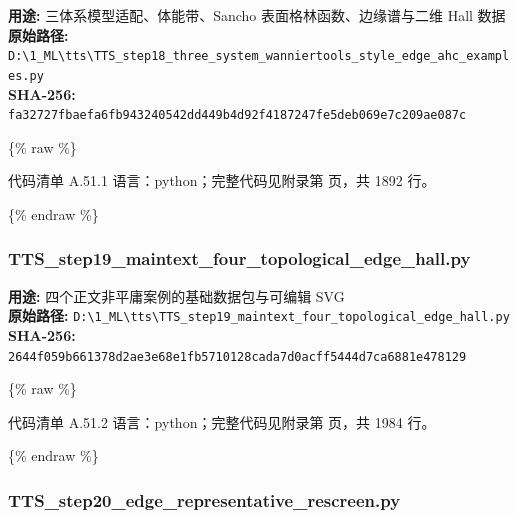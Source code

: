 \documentclass[lang=cn,scheme=chinese,color=blue,device=normal,toc=onecol,math=cm]{elegantbook}
\begin{document}
\textbf{用途:} 三体系模型适配、体能带、Sancho 表面格林函数、边缘谱与二维 Hall 数据\\ \textbf{原始路径:} \texttt{D:\textbackslash{}\allowbreak{}1\_\allowbreak{}ML\textbackslash{}\allowbreak{}tts\textbackslash{}\allowbreak{}TTS\_\allowbreak{}step18\_\allowbreak{}three\_\allowbreak{}system\_\allowbreak{}wanniertools\_\allowbreak{}style\_\allowbreak{}edge\_\allowbreak{}ahc\_\allowbreak{}examples.py}\\ \textbf{SHA-256:} \texttt{fa32727fbaefa6fb943240542dd449b4d92f4187247fe5deb069e7c209ae087c}\par


\{\% raw \%\}\par


\begin{codeindexbox}{代码清单 A.51.1}
语言：python；完整代码见附录第 \pageref{code:51:1} 页，共 1892 行。
\end{codeindexbox}


\{\% endraw \%\}\par


\subsubsection{TTS\_\allowbreak{}step19\_\allowbreak{}maintext\_\allowbreak{}four\_\allowbreak{}topological\_\allowbreak{}edge\_\allowbreak{}hall.py}


\textbf{用途:} 四个正文非平庸案例的基础数据包与可编辑 SVG\\ \textbf{原始路径:} \texttt{D:\textbackslash{}\allowbreak{}1\_\allowbreak{}ML\textbackslash{}\allowbreak{}tts\textbackslash{}\allowbreak{}TTS\_\allowbreak{}step19\_\allowbreak{}maintext\_\allowbreak{}four\_\allowbreak{}topological\_\allowbreak{}edge\_\allowbreak{}hall.py}\\ \textbf{SHA-256:} \texttt{2644f059b661378d2ae3e68e1fb5710128cada7d0acff5444d7ca6881e478129}\par


\{\% raw \%\}\par


\begin{codeindexbox}{代码清单 A.51.2}
语言：python；完整代码见附录第 \pageref{code:51:2} 页，共 1984 行。
\end{codeindexbox}


\{\% endraw \%\}\par


\subsubsection{TTS\_\allowbreak{}step20\_\allowbreak{}edge\_\allowbreak{}representative\_\allowbreak{}rescreen.py}
\end{document}
